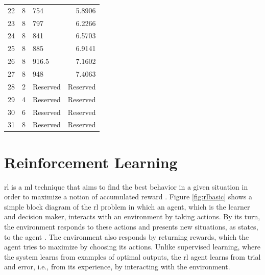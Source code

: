 \begin{table}[tb]
\begin{tabularx}{0.85\columnwidth}{l X X r}
  22 &  8   & 754       &  5.8906 \\
  23 &  8   & 797       &  6.2266 \\
  24 &  8   & 841       &  6.5703 \\
  25 &  8   & 885       &  6.9141 \\
  26 &  8   & 916.5     &  7.1602 \\
  27 &  8   & 948       &  7.4063 \\
  28 &  2   & Reserved  & Reserved \\
  29 &  4   & Reserved  & Reserved \\
  30 &  6   & Reserved  & Reserved \\
  31 &  8   & Reserved  & Reserved \\
  \bottomrule
\end{tabularx}
\end{table}







\section{Reinforcement Learning }
\label{sec:rl-theory}
\Gls{rl} is a \gls{ml} technique that aims to find the best behavior in a given situation in order to maximize a notion of accumulated reward \cite{Bishop07}.
%
Figure \ref{fig:rlbasic} shows a simple block diagram of the \gls{rl} problem in which an agent, which is the learner and decision maker, interacts with an environment by taking actions.
%
By its turn, the environment responds to these actions and presents new situations, as states, to the agent \cite{sutton2018rl}.
%
The environment also responds by returning rewards, which the agent tries to maximize by choosing its actions.
%
Unlike supervised learning, where the system learns from examples of optimal outputs, the \gls{rl} agent learns from trial and error, i.e., from its experience, by interacting with the environment.

